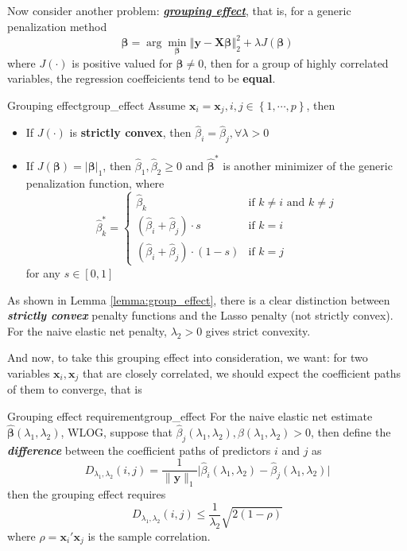 \documentclass[twoside]{article}
\begin{document}
Now consider another problem: \textit{\textbf{\underline{grouping effect}}}, that is, for a generic penalization method 
$$
\hat{\boldsymbol{\beta}} =\arg\min_{\boldsymbol{\beta}} \left\Vert \mathbf{y}-\mathbf{X}\boldsymbol{\beta} \right\Vert^2_2 + \lambda J(\boldsymbol{\beta})
$$
where $J(\cdot)$ is positive valued for $\boldsymbol{\beta}\neq 0$, then for a group of highly correlated variables, the regression coeffeicients tend to be \textbf{equal}.

\begin{lemma}{Grouping effect}{group_effect}
    Assume $\mathbf{x}_i=\mathbf{x}_j,i,j\in\left\{ 1,\cdots,p \right\}$, then
    \begin{itemize}
        \item If $J(\cdot)$ is \textbf{strictly convex}, then $\hat{\beta}_i = \hat{\beta}_j,\forall \lambda >0$
        \item If $J(\boldsymbol{\beta})=\lvert \boldsymbol{\beta} \rvert _1$, then $\hat{\beta}_1,\hat{\beta}_2\geq 0$ and $\hat{\boldsymbol{\beta}}^*$ is another minimizer of the generic penalization function, where 
        $$ \hat{\beta}^*_k = \begin{cases}
            \hat{\beta}_k & \text{if }k\neq i \text{ and }k\neq j\\
            \left(\hat{\beta}_i + \hat{\beta}_j\right)\cdot s & \text{if }k=i \\
            \left(\hat{\beta}_i + \hat{\beta}_j\right)\cdot (1-s) & \text{if }k=j
        \end{cases} $$ for any $s\in [0,1]$
    \end{itemize}
\end{lemma}
As shown in Lemma \ref{lemma:group_effect}, there is a clear distinction between \textbf{\textit{strictly convex}} penalty functions and the Lasso penalty (not strictly convex). For the naive elastic net penalty, $\lambda_2>0$ gives strict convexity. 

And now, to take this grouping effect into consideration, we want: for two variables $\mathbf{x}_i,\mathbf{x}_j$ that are closely correlated, we should expect the coefficient paths of them to converge, that is 
\begin{theorem}{Grouping effect requirement}{group_effect}
    For the naive elastic net estimate $\hat{\boldsymbol{\beta}}(\lambda_1,\lambda_2)$, WLOG, suppose that $\hat{\beta}_j(\lambda_1,\lambda_2),\hat{\beta}(\lambda_1,\lambda_2)>0$, then define the \textbf{\textit{difference}} between the coefficient paths of predictors $i$ and $j$ as 
    $$
    D_{\lambda_1,\lambda_2}(i,j) = \frac{1}{\lVert \mathbf{y}\rVert _1}\lvert \hat{\beta}_i(\lambda_1,\lambda_2)-\hat{\beta}_j(\lambda_1,\lambda_2) \rvert
    $$
    then the grouping effect requires 
    $$
    D_{\lambda_1,\lambda_2}(i,j)\leq \frac{1}{\lambda_2}\sqrt{2(1-\rho)}
    $$
    where $\rho = \mathbf{x}_i'\mathbf{x}_j$ is the sample correlation.
\end{theorem}
\end{document}
